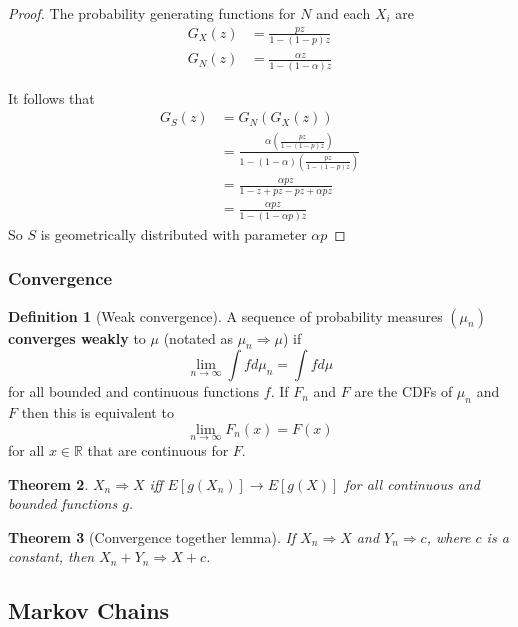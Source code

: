 \documentclass{article}
\theoremstyle{plain}
\newtheorem{theorem}{Theorem}[section]
\theoremstyle{definition}
\newtheorem{defn}[theorem]{Definition}
\theoremstyle{remark}
\numberwithin{equation}{section}
\newcommand{\R}{\mathbb{R}}
\begin{document}
\begin{proof}
The probability generating functions for $N$ and each $X_i$ are
\begin{align*}
    G_X(z) &= \frac{p z}{1 - (1 - p)z}\\
    G_{N}(z) &= \frac{\alpha z}{1 - (1 - \alpha)z}
\end{align*}

It follows that
\begin{align*}
    G_S(z) &= G_N(G_X(z))\\
    &= \frac{
    \alpha \left( \frac{p z}{1 - (1 - p)z} \right)
    }{
        1 - (1 - \alpha) \left( \frac{p z}{1 - (1 - p)z} \right)
    }\\
    &= \frac{
        \alpha p z
    }{
        1 - z + pz - pz + \alpha p z
    } \\
    &= \frac{
        \alpha p z
    }{
        1 - (1 - \alpha p) z
    }
\end{align*}
So $S$ is geometrically distributed with parameter $\alpha p$
\end{proof}

\subsubsection{Convergence}

\begin{defn}[Weak convergence]
A sequence of probability measures $(\mu_n)$ \textbf{converges weakly} to $\mu$ (notated as $\mu_n \Rightarrow \mu$) if
$$
\lim_{n \to \infty} \int f d\mu_n = \int f d\mu
$$
for all bounded and continuous functions $f$.
If $F_n$ and $F$ are the CDFs of $\mu_n$ and $F$ then this is equivalent to
$$
\lim_{n \to \infty} F_n(x) = F(x)
$$
for all $x \in \R$ that are continuous for $F$.
\end{defn}

\begin{theorem}
$X_n \Rightarrow X$ iff $E[g(X_n)] \to E[g(X)]$ for all continuous and bounded functions $g$.
\end{theorem}

\begin{theorem}[Convergence together lemma] \label{thm:conv_together_lemma}
If $X_n \Rightarrow X$ and $Y_n \Rightarrow c$, where $c$ is a constant, then $X_n + Y_n \Rightarrow X + c$.
\end{theorem}

\subsection{Markov Chains}
\end{document}
